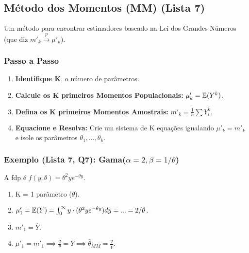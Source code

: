 \subsection{Método dos Momentos (MM) (Lista 7)}
Um método para encontrar estimadores baseado na Lei dos Grandes Números (que diz $m'_k \xrightarrow{p} \mu'_k$).

\subsubsection{Passo a Passo}
\begin{enumerate}
    \item \textbf{Identifique K}, o número de parâmetros.
    \item \textbf{Calcule os K primeiros Momentos Populacionais:} $\mu'_k = \mathbb{E}(Y^k)$.
    \item \textbf{Defina os K primeiros Momentos Amostrais:} $m'_k = \frac{1}{n} \sum Y_i^k$.
    \item \textbf{Equacione e Resolva:} Crie um sistema de K equações igualando $\mu'_k = m'_k$ e isole os parâmetros $\theta_1, ..., \theta_k$.
\end{enumerate}

\subsubsection{Exemplo (Lista 7, Q7): Gama($\alpha=2, \beta=1/\theta$)}
A fdp é $f(y;\theta) = \theta^2 y e^{-\theta y}$.
\begin{enumerate}
    \item K = 1 parâmetro ($\theta$).
    \item $\mu'_1 = \mathbb{E}(Y) = \int_0^\infty y \cdot (\theta^2 y e^{-\theta y}) dy = ... = 2/\theta$.
    \item $m'_1 = \overline{Y}$.
    \item $\mu'_1 = m'_1 \implies \frac{2}{\theta} = \overline{Y} \implies \hat{\theta}_{MM} = \frac{2}{\overline{Y}}$.
\end{enumerate}

